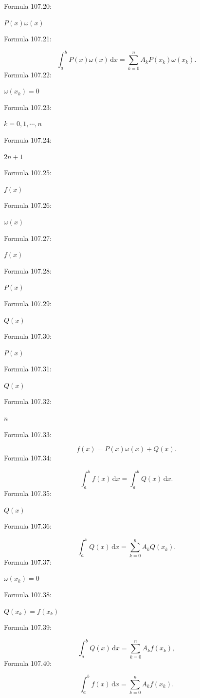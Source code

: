 \documentclass[11pt]{article}
\begin{document}
\noindent Formula 107.20:\par
$P(x)\omega(x)$\par
\noindent Formula 107.21:\par
\[
\int_a^b P(x)\omega(x)\,\mathrm{d}x
=\sum_{k=0}^{n}A_kP(x_k)\omega(x_k).
\]
\noindent Formula 107.22:\par
$\omega(x_k)=0$\par
\noindent Formula 107.23:\par
$k=0,1,\cdots,n$\par
\noindent Formula 107.24:\par
$2n+1$\par
\noindent Formula 107.25:\par
$f(x)$\par
\noindent Formula 107.26:\par
$\omega(x)$\par
\noindent Formula 107.27:\par
$f(x)$\par
\noindent Formula 107.28:\par
$P(x)$\par
\noindent Formula 107.29:\par
$Q(x)$\par
\noindent Formula 107.30:\par
$P(x)$\par
\noindent Formula 107.31:\par
$Q(x)$\par
\noindent Formula 107.32:\par
$n$\par
\noindent Formula 107.33:\par
\[
f(x)=P(x)\omega(x)+Q(x).
\]
\noindent Formula 107.34:\par
\[
\int_a^b f(x)\,\mathrm{d}x=\int_a^b Q(x)\,\mathrm{d}x.
\tag{4.4.3}
\]
\noindent Formula 107.35:\par
$Q(x)$\par
\noindent Formula 107.36:\par
\[
\int_a^b Q(x)\,\mathrm{d}x=\sum_{k=0}^{n}A_kQ(x_k).
\]
\noindent Formula 107.37:\par
$\omega(x_k)=0$\par
\noindent Formula 107.38:\par
$Q(x_k)=f(x_k)$\par
\noindent Formula 107.39:\par
\[
\int_a^b Q(x)\,\mathrm{d}x=\sum_{k=0}^{n}A_kf(x_k),
\]
\noindent Formula 107.40:\par
\[
\int_a^b f(x)\,\mathrm{d}x=\sum_{k=0}^{n}A_kf(x_k).
\]
\clearpage
\end{document}
